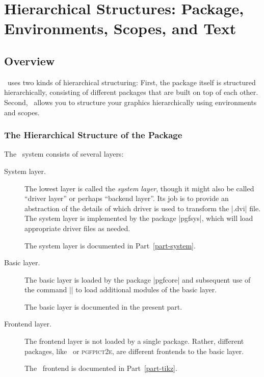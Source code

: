 %
%
%


\section[base-scopes]
        {Hierarchical Structures:
         Package, Environments, Scopes, and Text}

\subsection{Overview}

\pgfname\ uses two kinds of hierarchical structuring: First, the package itself
is structured hierarchically, consisting of different packages that are built
on top of each other. Second, \pgfname\ allows you to structure your graphics
hierarchically using environments and scopes.


\subsubsection{The Hierarchical Structure of the Package}

The \pgfname\ system consists of several layers:
%
\begin{description}
    \item[System layer.]
        The lowest layer is called the \emph{system layer}, though it might
        also be called ``driver layer'' or perhaps ``backend layer''. Its job
        is to provide an abstraction of the details of which driver is used to
        transform the |.dvi| file. The system layer is implemented by the
        package |pgfsys|, which will load appropriate driver files as needed.

        The system layer is documented in Part~\ref{part-system}.
    \item[Basic layer.]
        The basic layer is loaded by the package |pgfcore| and subsequent use
        of the command |\usepgfmodule| to load additional modules of the basic
        layer.

        The basic layer is documented in the present part.
    \item[Frontend layer.]
        The frontend layer is not loaded by a single package. Rather, different
        packages, like \tikzname\ or \textsc{pgfpict2e}, are different
        frontends to the basic layer.

        The \tikzname\ frontend is documented in Part~\ref{part-tikz}.
\end{description}

